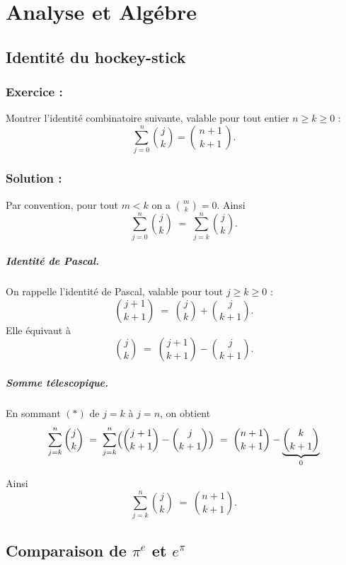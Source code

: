 \chapter{ Analyse et Algébre}

\section{Identité du hockey-stick}

\subsection*{Exercice :}

\begin{exerciseBox}
Montrer l’identité combinatoire suivante, valable pour tout entier $n \ge k \ge 0$ :
\[
\sum_{j=0}^{\,n} \binom{j}{k}
= \binom{\,n+1\,}{\,k+1\,}.
\]
\end{exerciseBox}


\subsection*{Solution :}

Par convention, pour tout $m<k$ on a $\binom{m}{k}=0$. Ainsi
\[
\sum_{j=0}^{n} \binom{j}{k}
\;=\; \sum_{j=k}^{n} \binom{j}{k}.
\]

\paragraph{Identité de Pascal.}
On rappelle l’identité de Pascal, valable pour tout $j\ge k\ge 0$ :
\[
\binom{j+1}{k+1} \;=\; \binom{j}{k} + \binom{j}{k+1}.
\]
Elle équivaut à
\[
\binom{j}{k} \;=\; \binom{j+1}{k+1} - \binom{j}{k+1}.
\tag{$\ast$}
\]

\paragraph{Somme télescopique.}
En sommant \((\ast)\) de $j=k$ à $j=n$, on obtient
\[
\sum_{j=k}^{n} \binom{j}{k}
\;=\;
\sum_{j=k}^{n}\Bigl(\binom{j+1}{k+1} - \binom{j}{k+1}\Bigr)
\;=\;
\binom{n+1}{k+1} - \underbrace{\binom{k}{k+1}}_{0}
\]

Ainsi
\[
\boxed{
\sum_{j=k}^{n} \binom{j}{k} \;=\; \binom{n+1}{k+1}.
}\]


\section{Comparaison de $\pi^e$ et $e^\pi$}

